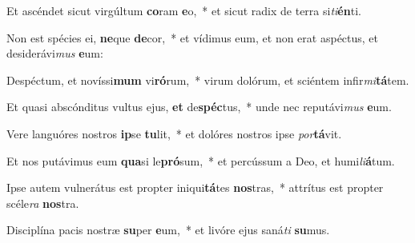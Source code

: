 \item Et ascéndet sicut virgúltum \textbf{co}ram \textbf{e}o,~* et sicut radix de terra si\textit{ti}\textbf{én}ti.
\item Non est spécies ei, \textbf{ne}que \textbf{de}cor,~* et vídimus eum, et non erat aspéctus, et desiderávi\textit{mus} \textbf{e}um:
\item Despéctum, et novíssi\textbf{mum} vi\textbf{ró}rum,~* virum dolórum, et sciéntem infir\textit{mi}\textbf{tá}tem.
\item Et quasi abscónditus vultus ejus, \textbf{et} de\textbf{spéc}tus,~* unde nec reputávi\textit{mus} \textbf{e}um.
\item Vere languóres nostros \textbf{ip}se \textbf{tu}lit,~* et dolóres nostros ipse \textit{por}\textbf{tá}vit.
\item Et nos putávimus eum \textbf{qua}si le\textbf{pró}sum,~* et percússum a Deo, et humi\textit{li}\textbf{á}tum.
\item Ipse autem vulnerátus est propter iniqui\textbf{tá}tes \textbf{nos}tras,~* attrítus est propter scéle\textit{ra} \textbf{nos}tra.
\item Disciplína pacis nostræ \textbf{su}per \textbf{e}um,~* et livóre ejus saná\textit{ti} \textbf{su}mus.
